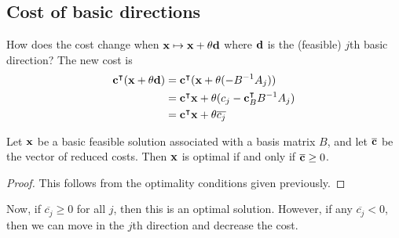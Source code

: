 \subsection{Cost of basic directions}
How does the cost change when \( \vb x \mapsto \vb x + \theta \vb d \) where \( \vb d \) is the (feasible) \( j \)th basic direction?
The new cost is
\begin{align*}
	\vb c^\intercal (\vb x + \theta \vb d) & = \vb c^\intercal (\vb x + \theta (-B^{-1}A_j))                        \\
	                                        & = \vb c^\intercal \vb x + \theta (c_j - \vb c_B^\intercal B^{-1} A_j) \\
	                                        & = \vb c^\intercal \vb x + \theta \overline{c_j}                        \\
\end{align*}
\begin{theorem}
	Let \( \vb x \) be a basic feasible solution associated with a basis matrix \( B \), and let \( \overline{\vb c} \) be the vector of reduced costs.
	Then \( \vb x \) is optimal if and only if \( \overline{\vb c} \geq 0 \).
\end{theorem}
\begin{proof}
	This follows from the optimality conditions given previously.
\end{proof}
Now, if \( \overline{c_j} \geq 0 \) for all \( j \), then this is an optimal solution.
However, if any \( \overline{c_j} < 0 \), then we can move in the \( j \)th direction and decrease the cost.

